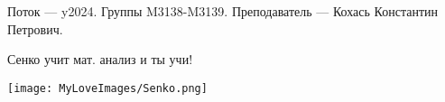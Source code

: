 Поток — y2024.\newline
Группы M3138-M3139.\newline
Преподаватель --- Кохась Константин Петрович.\par

Сенко учит мат. анализ и ты учи!
\begin{center}
   \texttt{[image: MyLoveImages/Senko.png]}
\end{center}